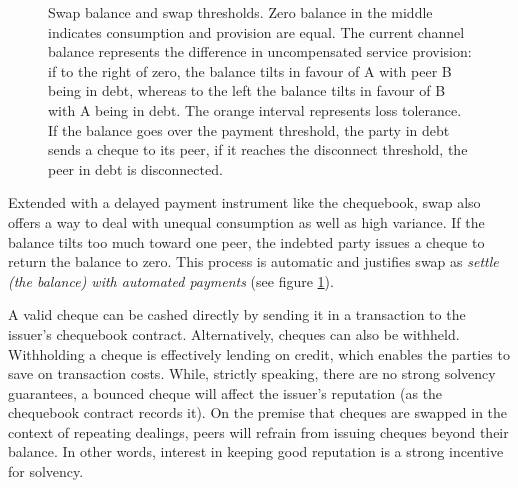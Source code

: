 \documentclass[a4paper,10pt]{article}
\begin{document}
\begin{center}
\begin{figure}
\begin{center}
\end{center}
\caption{Swap balance and swap thresholds.
Zero balance in the middle indicates consumption and provision are equal.
The current channel balance represents the difference in uncompensated service provision:
if to the right of zero, the balance tilts in favour of A with peer B being in debt, whereas to the left
the balance tilts in favour of B with A being in debt.
The orange interval represents loss tolerance. If the balance goes over the payment threshold, the party in
debt sends a cheque to its peer, if it reaches the disconnect threshold, the peer in debt is disconnected.}
\label{fig:swap}
\end{figure}
\end{center}

Extended with a delayed payment instrument
like the chequebook, swap also offers a way to deal with unequal consumption
as well as high variance.
If the balance tilts too much toward one peer, the indebted
party issues a cheque to return the balance to zero.
This process is automatic and justifies swap as \emph{settle (the balance) with automated payments}
(see figure \ref{fig:swap}).

A valid cheque can be cashed directly by sending it
in a transaction to the issuer's chequebook contract. Alternatively, cheques can also be withheld.
Withholding a cheque is effectively lending on credit, which enables the parties to save on
transaction costs.
While, strictly speaking, there are no strong solvency guarantees,
a bounced cheque will affect the issuer's reputation (as the chequebook contract records it).
On the premise that
cheques are swapped in the context of repeating dealings, peers will refrain from
issuing cheques beyond their balance.
In other words, interest in keeping good reputation is a strong incentive for
solvency.
\end{document}
